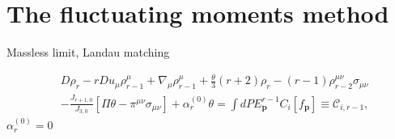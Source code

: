 \documentclass[aps,prd,preprint,nofootinbib,amsmath,amssymb,showpacs,longbibliography,singlecolumn,superscriptaddress,10pt]{revtex4-1}
\theoremstyle{plain}
\theoremstyle{definition}
\begin{document}
\section{The fluctuating moments method}


Massless limit, Landau matching 

%
\begin{equation}
\label{eq:transient-l=0}
\begin{aligned}
&
D\rho _{r} 
- 
r Du_{\mu} \rho_{r-1}^{\mu} 
+
\nabla_{\mu} \rho^{\mu}_{r-1}
+  
\frac{\theta}{3} (r+2) \rho_{r} 
- (r-1) \rho_{r-2}^{\mu \nu} \sigma_{\mu \nu}\\
& 
-
\frac{J_{r+1,0}}{J_{3,0}}[\Pi \theta - \pi^{\mu \nu} \sigma_{\mu \nu} ]
+
\alpha_{r}^{(0)}  \theta
=
\int dP E_{\mathbf{p}}^{r-1} C_{i}[f_{\mathbf{p}}]
\equiv
\mathcal{C}_{i,r-1},
\end{aligned}
\end{equation}
%
$\alpha_{r}^{(0)} = 0$
\end{document}
